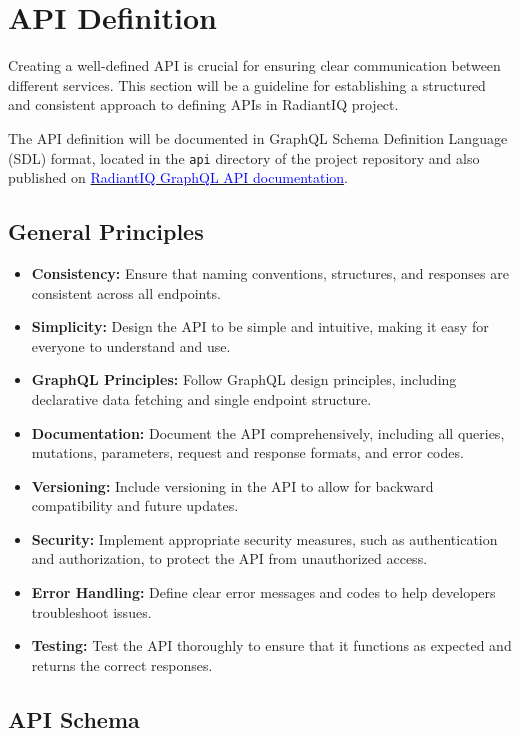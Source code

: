 \section{API Definition} \label{api_definition}

Creating a well-defined API is crucial for ensuring clear communication between different services. This section will be a guideline for establishing a structured and consistent approach to defining APIs in RadiantIQ project.

The API definition will be documented in GraphQL Schema Definition Language (SDL) format, located in the \texttt{api} directory of the project repository and also published on \href{TODO add link here}{\textcolor{blue}{RadiantIQ GraphQL API documentation}}.

\subsection{General Principles}

\begin{itemize}
    \item \textbf{Consistency:} Ensure that naming conventions, structures, and responses are consistent across all endpoints.
    \item \textbf{Simplicity:} Design the API to be simple and intuitive, making it easy for everyone to understand and use.
    \item \textbf{GraphQL Principles:} Follow GraphQL design principles, including declarative data fetching and single endpoint structure.
    \item \textbf{Documentation:} Document the API comprehensively, including all queries, mutations, parameters, request and response formats, and error codes.
    \item \textbf{Versioning:} Include versioning in the API to allow for backward compatibility and future updates.
    \item \textbf{Security:} Implement appropriate security measures, such as authentication and authorization, to protect the API from unauthorized access.
    \item \textbf{Error Handling:} Define clear error messages and codes to help developers troubleshoot issues.
    \item \textbf{Testing:} Test the API thoroughly to ensure that it functions as expected and returns the correct responses.
\end{itemize}

\subsection{API Schema}

